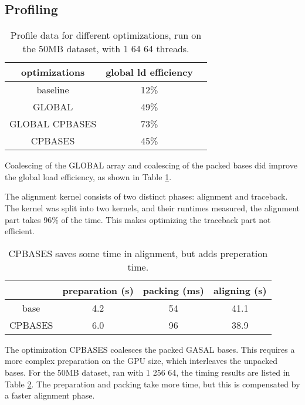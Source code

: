 \documentclass[../main/thesis.tex]{subfiles}
\begin{document}




\newpage



\subsection{Profiling}

\begin{table}
\centering
\caption{Profile data for different optimizations, run on the 50MB dataset, with 1 64 64 threads.}
\label{tbl:darwin_prof}
\begin{tabular}{c c c}
optimizations & global ld efficiency \\ \hline
baseline & 12\% \\
GLOBAL & 49\% \\
GLOBAL CPBASES & 73\% \\
CPBASES & 45\% \\
\end{tabular}
\end{table}

Coalescing of the GLOBAL array and coalescing of the packed bases did improve the global load efficiency, as shown in Table \ref{tbl:darwin_prof}.

The alignment kernel consists of two distinct phases: alignment and traceback.
The kernel was split into two kernels, and their runtimes measured, the alignment part takes 96\% of the time.
This makes optimizing the traceback part not efficient.

\begin{table}
\centering
\caption{CPBASES saves some time in alignment, but adds preperation time.}
\label{tbl:CPBASES}
\begin{tabular}{c c c c}
& preparation (s) & packing (ms) & aligning (s) \\ \hline
base & 4.2 & 54 & 41.1 \\
CPBASES & 6.0 & 96 & 38.9 \\
\end{tabular}
\end{table}

The optimization CPBASES coalesces the packed GASAL bases.
This requires a more complex preparation on the GPU size, which interleaves the unpacked bases.
For the 50MB dataset, ran with 1 256 64, the timing results are listed in Table \ref{tbl:CPBASES}.
The preparation and packing take more time, but this is compensated by a faster alignment phase.
\end{document}
